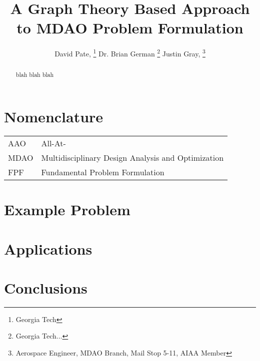 \documentclass[]{aiaa-tc} %
\title{A Graph Theory Based Approach to MDAO Problem Formulation}
\author{
  David Pate, %
     \thanks{Georgia Tech}
  Dr. Brian German 
     \thanks{Georgia Tech...}
  Justin Gray,%
     \thanks{Aerospace Engineer, MDAO Branch, Mail Stop 5-11, AIAA Member}   
 }
\begin{document}
\maketitle
 
\begin{abstract}
   blah blah blah
\end{abstract}

\section*{Nomenclature}

\begin{tabular}{l l} 
    AAO      & All-At- \\
    MDAO     & Multidisciplinary Design Analysis and Optimization \\
    FPF      & Fundamental Problem Formulation \\
\end{tabular}





    
\section{Example Problem}

\section{Applications}

\section{Conclusions}


\end{document}
